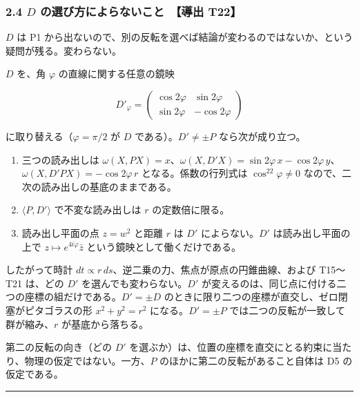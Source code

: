 \documentclass[
  a4paper,
]{ltjsarticle}
\providecommand{\tightlist}{%
  \setlength{\itemsep}{0pt}\setlength{\parskip}{0pt}}
\begin{document}
\subsubsection{\texorpdfstring{2.4 \(D\) の選び方によらないこと　【導出
T22】}{2.4 D の選び方によらないこと　【導出 T22】}}\label{d-ux306eux9078ux3073ux65b9ux306bux3088ux3089ux306aux3044ux3053ux3068-ux5c0eux51fa-t22}

\(D\) は P1
から出ないので、別の反転を選べば結論が変わるのではないか、という疑問が残る。変わらない。

\(D\) を、角 \(\varphi\) の直線に関する任意の鏡映

\[
D'_\varphi=\begin{pmatrix}\cos2\varphi&\sin2\varphi\\\sin2\varphi&-\cos2\varphi\end{pmatrix}
\]

に取り替える（\(\varphi=\pi/2\) が \(D\) である）。\(D'\neq\pm P\)
なら次が成り立つ。

\begin{enumerate}
\def\labelenumi{\arabic{enumi}.}
\tightlist
\item
  三つの読み出しは
  \(\omega(X,PX)=x\)、\(\omega(X,D'X)=\sin2\varphi\,x-\cos2\varphi\,y\)、\(\omega(X,D'PX)=-\cos2\varphi\,r\)
  となる。係数の行列式は \(\cos^22\varphi\neq0\)
  なので、二次の読み出しの基底のままである。
\item
  \(\langle P,D'\rangle\) で不変な読み出しは \(r\) の定数倍に限る。
\item
  読み出し平面の点 \(z=w^2\) と距離 \(r\) は \(D'\) によらない。\(D'\)
  は読み出し平面の上で \(z\mapsto e^{4i\varphi}\bar z\)
  という鏡映として働くだけである。
\end{enumerate}

したがって時計
\(dt\propto r\,ds\)、逆二乗の力、焦点が原点の円錐曲線、および T15〜T21
は、どの \(D'\) を選んでも変わらない。\(D'\)
が変えるのは、同じ点に付ける二つの座標の組だけである。\(D'=\pm D\)
のときに限り二つの座標が直交し、ゼロ閉塞がピタゴラスの形 \(x^2+y^2=r^2\)
になる。\(D'=\pm P\) では二つの反転が一致して群が縮み、\(r\)
が基底から落ちる。

第二の反転の向き（どの \(D'\)
を選ぶか）は、位置の座標を直交にとる約束に当たり、物理の仮定ではない。一方、\(P\)
のほかに第二の反転があること自体は D5 の仮定である。

\begin{center}\rule{0.5\linewidth}{0.5pt}\end{center}
\end{document}

